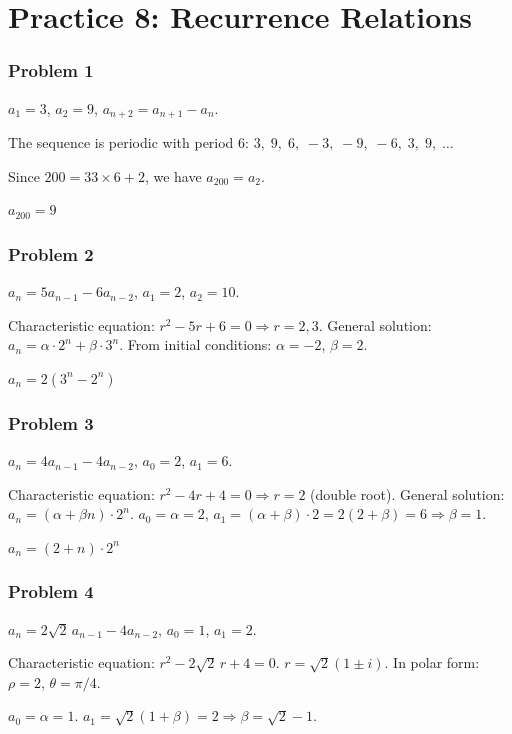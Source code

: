 
\section*{Practice 8: Recurrence Relations}

\subsubsection*{Problem 1}
$a_1=3$, $a_2=9$, $a_{n+2}=a_{n+1}-a_n$.

The sequence is periodic with period 6:
$3,\;9,\;6,\;-3,\;-9,\;-6,\;3,\;9,\;\ldots$

Since $200 = 33\times 6 + 2$, we have $a_{200}=a_2$.

$\boxed{a_{200}=9}$

\subsubsection*{Problem 2}
$a_n=5a_{n-1}-6a_{n-2}$, $a_1=2$, $a_2=10$.

Characteristic equation: $r^2-5r+6=0 \Rightarrow r=2,3$.
General solution: $a_n=\alpha\cdot 2^n+\beta\cdot 3^n$.
From initial conditions: $\alpha=-2$, $\beta=2$.

$\boxed{a_n = 2(3^n - 2^n)}$

\subsubsection*{Problem 3}
$a_n=4a_{n-1}-4a_{n-2}$, $a_0=2$, $a_1=6$.

Characteristic equation: $r^2-4r+4=0\Rightarrow r=2$ (double root).
General solution: $a_n=(\alpha+\beta n)\cdot 2^n$.
$a_0=\alpha=2$, $a_1=(\alpha+\beta)\cdot 2 = 2(2+\beta)=6 \Rightarrow \beta=1$.

$\boxed{a_n = (2+n)\cdot 2^n}$

\subsubsection*{Problem 4}
$a_n = 2\sqrt{2}\,a_{n-1}-4a_{n-2}$, $a_0=1$, $a_1=2$.

Characteristic equation: $r^2-2\sqrt{2}\,r+4=0$.
$r = \sqrt{2}(1\pm i)$. In polar form: $\rho=2$, $\theta=\pi/4$.

$a_0 = \alpha = 1$. $a_1 = \sqrt{2}(1+\beta)=2 \Rightarrow \beta = \sqrt{2}-1$.

